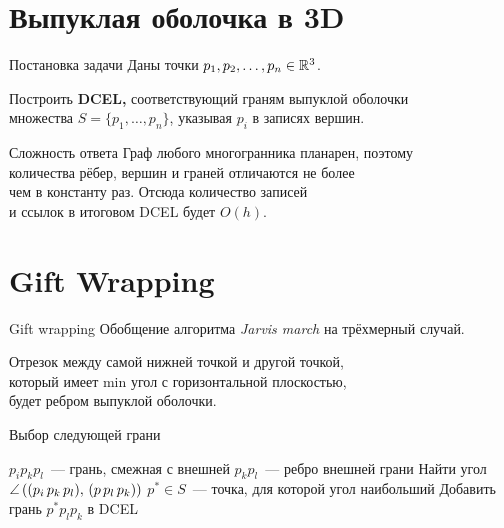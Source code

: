 \section{Выпуклая оболочка в 3D}

\begin{frame}{Постановка задачи}
	Даны точки \(p_1, p_2, \ldots, p_n \in \mathbb{R}^3\).

	Построить {\bf DCEL,} соответствующий граням выпуклой оболочки \\
	множества \(S = \{p_1, \ldots, p_n\}\), указывая \(p_i\) в записях вершин.
\end{frame}


\begin{frame}{Сложность ответа}
	Граф любого многогранника планарен, поэтому \\
	количества рёбер, вершин и граней отличаются не более \\
	чем в константу раз. Отсюда количество записей \\
	и ссылок в итоговом DCEL будет \(O(h)\).
\end{frame}


\section{Gift Wrapping}

\begin{frame}{Gift wrapping}
	Обобщение алгоритма {\it Jarvis march} на трёхмерный случай.

	Отрезок между самой нижней точкой и другой точкой, \\
	который имеет min угол с горизонтальной плоскостью, \\
	будет ребром выпуклой оболочки.
\end{frame}


\begin{frame}{Выбор следующей грани}
\begin{center} \begin{algorithmic}
      \State \(p_i p_k p_l\)~— грань, смежная с внешней
      \State \(p_k p_l\)~— ребро внешней грани
         \State Найти угол \(\angle\,\lr*{\lr*{p_i\,p_k\,p_l},\,\lr*{p\,p_l\,p_k}}\)
      \EndFor
      \State \(p^* \in S\)~— точка, для которой угол наибольший
      \State Добавить грань \(p^*p_lp_k\) в DCEL
   \EndWhile \pause {}
\end{algorithmic} \end{center}
\end{frame}


